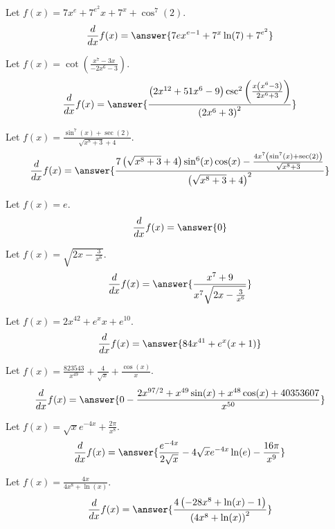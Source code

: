 \documentclass{ximera}
\begin{document}
\begin{shuffle}
\begin{exercise}
Let $f(x)=7 x^e+7^{e^2} x+7^x+\cos ^7(2)$.
\[
\ddx f(x) = \answer{7 e x^{e-1}+7^x \ln (7)+7^{e^2}}
\]
\end{exercise}

\begin{exercise}
Let $f(x)=\cot \left(\frac{x^7-3 x}{-2 x^6-3}\right)$.
\[
\ddx f(x) = \answer{\frac{\left(2 x^{12}+51 x^6-9\right) \csc ^2\left(\frac{x \left(x^6-3\right)}{2 x^6+3}\right)}{\left(2 x^6+3\right)^2}}
\]
\end{exercise}

\begin{exercise}
Let $f(x)=\frac{\sin ^7(x)+\sec (2)}{\sqrt{x^8+3}+4}$.
\[
\ddx f(x) = \answer{\frac{7 \left(\sqrt{x^8+3}+4\right) \sin ^6(x) \cos (x)-\frac{4 x^7 \left(\sin ^7(x)+\sec (2)\right)}{\sqrt{x^8+3}}}{\left(\sqrt{x^8+3}+4\right)^2}}
\]
\end{exercise}

\begin{exercise}
Let $f(x)=e$.
\[
\ddx f(x) = \answer{0}
\]
\end{exercise}

\begin{exercise}
Let $f(x)=\sqrt{2 x-\frac{3}{x^6}}$.
\[
\ddx f(x) = \answer{\frac{x^7+9}{x^7 \sqrt{2 x-\frac{3}{x^6}}}}
\]
\end{exercise}

\begin{exercise}
Let $f(x)=2 x^{42}+e^x x+e^{10}$.
\[
\ddx f(x) = \answer{84 x^{41}+e^x (x+1)}
\]
\end{exercise}

\begin{exercise}
Let $f(x)=\frac{823543}{x^{49}}+\frac{4}{\sqrt{x}}+\frac{\cos (x)}{x}$.
\[
\ddx f(x) = \answer{0-\frac{2 x^{97/2}+x^{49} \sin (x)+x^{48} \cos (x)+40353607}{x^{50}}}
\]
\end{exercise}

\begin{exercise}
Let $f(x)=\sqrt{x} e^{-4 x}+\frac{2 \pi }{x^8}$.
\[
\ddx f(x) = \answer{\frac{e^{-4 x}}{2 \sqrt{x}}-4 \sqrt{x} e^{-4 x} \ln (e)-\frac{16 \pi }{x^9}}
\]
\end{exercise}

\begin{exercise}
Let $f(x)=\frac{4 x}{4 x^8+\ln (x)}$.
\[
\ddx f(x) = \answer{\frac{4 \left(-28 x^8+\ln (x)-1\right)}{\left(4 x^8+\ln (x)\right)^2}}
\]
\end{exercise}


\end{shuffle}
\end{document}
